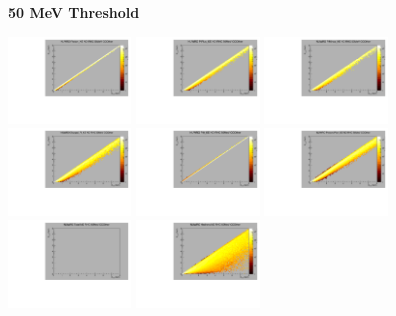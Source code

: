 \textbf{50 MeV Threshold}

\begin{center}

  \includegraphics[width=0.245\textwidth]{plots/response_matrix/Proton_KE_RHC_CCOther_50MeV.pdf}
  \includegraphics[width=0.245\textwidth]{plots/response_matrix/PiPlus_KE_RHC_CCOther_50MeV.pdf}
  \includegraphics[width=0.245\textwidth]{plots/response_matrix/PiMinus_KE_RHC_CCOther_50MeV.pdf}
  \includegraphics[width=0.245\textwidth]{plots/response_matrix/Charged_Pi_KE_RHC_CCOther_50MeV.pdf}
  \includegraphics[width=0.245\textwidth]{plots/response_matrix/Pi0_KE_RHC_CCOther_50MeV.pdf}
  \includegraphics[width=0.245\textwidth]{plots/response_matrix/Proton+Pion_KE_RHC_CCOther_50MeV.pdf}
  \includegraphics[width=0.245\textwidth]{plots/response_matrix/Total_RHC_CCOther_50MeV.pdf}
  \includegraphics[width=0.245\textwidth]{plots/response_matrix/Hadrons_RHC_CCOther_50MeV.pdf}

\end{center}
